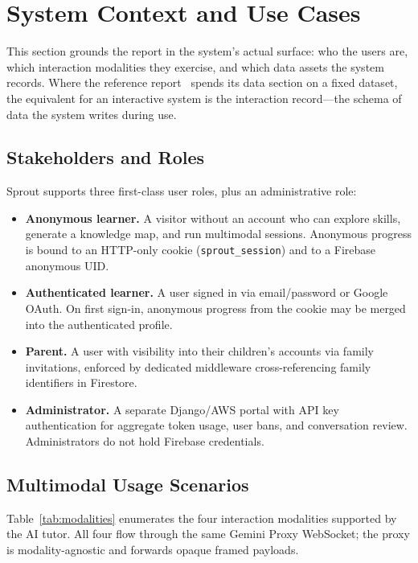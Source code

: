\chapter{System Context and Use Cases}
\label{ch:context}

This section grounds the report in the system's actual surface: who the users are, which interaction modalities they exercise, and which data assets the system records. Where the reference report~\cite{anh2026mmr} spends its data section on a fixed dataset, the equivalent for an interactive system is the interaction record---the schema of data the system writes during use.

\section{Stakeholders and Roles}
\label{sec:stakeholders}

Sprout supports three first-class user roles, plus an administrative role:
\begin{itemize}
    \item \textbf{Anonymous learner.} A visitor without an account who can explore skills, generate a knowledge map, and run multimodal sessions. Anonymous progress is bound to an HTTP-only cookie (\texttt{sprout\_session}) and to a Firebase anonymous UID.
    \item \textbf{Authenticated learner.} A user signed in via email/password or Google OAuth. On first sign-in, anonymous progress from the cookie may be merged into the authenticated profile.
    \item \textbf{Parent.} A user with visibility into their children's accounts via family invitations, enforced by dedicated middleware cross-referencing family identifiers in Firestore.
    \item \textbf{Administrator.} A separate Django/AWS portal with API key authentication for aggregate token usage, user bans, and conversation review. Administrators do not hold Firebase credentials.
\end{itemize}

\section{Multimodal Usage Scenarios}
\label{sec:modalities}

Table~\ref{tab:modalities} enumerates the four interaction modalities supported by the AI tutor. All four flow through the same Gemini Proxy WebSocket; the proxy is modality-agnostic and forwards opaque framed payloads.

